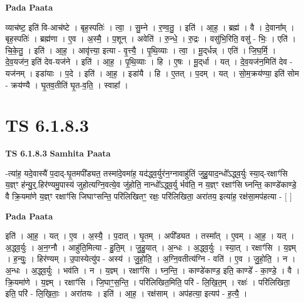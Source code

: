 \documentclass[17pt]{extarticle}
\begin{document}
\textbf{Pada Paata} \newline

व्याच॑ष्ट॒ इति॑ वि-आच॑ष्टे । बृह॒स्पतिः॑ । त्वा॒ । सु॒म्ने । र॒ण्व॒तु॒ । इति॑ । आ॒ह॒ । ब्रह्म॑ । वै । दे॒वाना᳚म् । बृह॒स्पतिः॑ । ब्रह्म॑णा । ए॒व । अ॒स्मै॒ । प॒शून् । अवेति॑ । रु॒न्धे॒ । रु॒द्रः । वसु॑भि॒रिति॒ वसु॑ - भिः॒ । एति॑ । चि॒के॒तु॒ । इति॑ । आ॒ह॒ । आवृ॑त्त्या॒ इत्या - वृ॒त्त्यै॒ । पृ॒थि॒व्याः । त्वा॒ । मू॒द्‌र्धन्न् । एति॑ । जि॒घ॒र्मि॒ । दे॒व॒यज॑न॒ इति॑ देव-यज॑ने । इति॑ । आ॒ह॒ । पृ॒थि॒व्याः । हि । ए॒षः । मू॒द्‌र्धा । यत् । दे॒व॒यज॑न॒मिति॑ देव - यज॑नम् । इडा॑याः । प॒दे । इति॑ । आ॒ह॒ । इडा॑यै । हि । ए॒तत् । प॒दम् । यत् । सो॒म॒क्रय॑ण्या॒ इति॑ सोम - क्रय॑ण्यै । घृ॒तव॒तीति॑ घृ॒त-व॒ति॒ । स्वाहा᳚ ।  \newline




\section*{ TS 6.1.8.3 }

\textbf{TS 6.1.8.3 } \newline
\textbf{Samhita Paata} \newline

-त्या॑ह॒ यदे॒वास्यै॑ प॒दाद्-घृ॒तमपी᳚ड्यत॒ तस्मा॑दे॒वमा॑ह॒ यद॑द्ध्व॒र्युर॑न॒ग्नावाहु॑तिं जुहु॒याद॒न्धो᳚ऽद्ध्व॒र्युः स्या॒द्-रक्षाꣳ॑सि य॒ज्ञ्ꣳ ह॑न्यु॒र्॒.हिर॑ण्यमु॒पास्य॑ जुहोत्यग्नि॒वत्ये॒व जु॑होति॒ नान्धो᳚ऽद्ध्व॒र्यु र्भव॑ति॒ न य॒ज्ञ्ꣳ रक्षाꣳ॑सि घ्नन्ति॒ काण्डे॑काण्डे॒ वै क्रि॒यमा॑णे य॒ज्ञ्ꣳ रक्षाꣳ॑सि जिघाꣳसन्ति॒ परि॑लिखितꣳ॒॒ रक्षः॒ परि॑लिखिता॒ अरा॑तय॒ इत्या॑ह॒ रक्ष॑सा॒मप॑हत्या - [  ] \newline

\textbf{Pada Paata} \newline

इति॑ । आ॒ह॒ । यत् । ए॒व । अ॒स्यै॒ । प॒दात् । घृ॒तम् । अपी᳚ड्यत । तस्मा᳚त् । ए॒वम् । आ॒ह॒ । यत् । अ॒द्ध्व॒र्युः । अ॒न॒ग्नौ । आहु॑ति॒मित्या - हु॒ति॒म् । जु॒हु॒यात् । अ॒न्धः । अ॒द्ध्व॒र्युः । स्या॒त् । रक्षाꣳ॑सि । य॒ज्ञ्म् । ह॒न्युः॒ । हिर॑ण्यम् । उ॒पास्येत्यु॑प - अस्य॑ । जु॒हो॒ति॒ । अ॒ग्नि॒वतीत्य॑ग्नि - वति॑ । ए॒व । जु॒हो॒ति॒ । न । अ॒न्धः । अ॒द्ध्व॒र्युः । भव॑ति । न । य॒ज्ञ्म् । रक्षाꣳ॑सि । घ्न॒न्ति॒ । काण्डे॑काण्ड॒ इति॒ काण्डे᳚ - का॒ण्डे॒ । वै । क्रि॒यमा॑णे । य॒ज्ञ्म् । रक्षाꣳ॑सि । जि॒घाꣳ॒॒स॒न्ति॒ । परि॑लिखित॒मिति॒ परि॑ - लि॒खि॒त॒म् । रक्षः॑ । परि॑लिखिता॒ इति॒ परि॑ - लि॒खि॒ताः॒ । अरा॑तयः । इति॑ । आ॒ह॒ । रक्ष॑साम् । अप॑हत्या॒ इत्यप॑ - ह॒त्यै॒ ।  \newline
\end{document}
